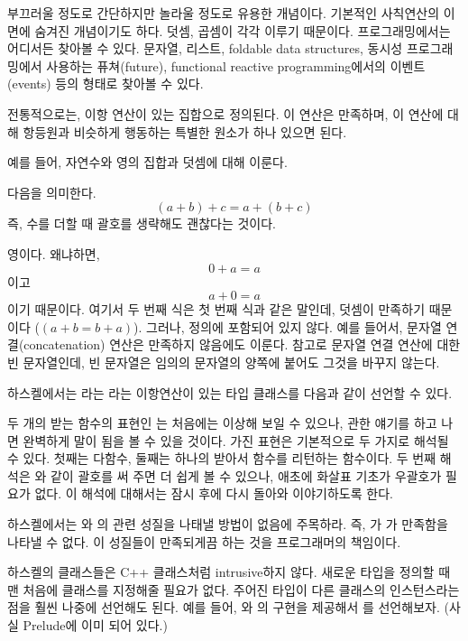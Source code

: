  부끄러울 정도로 간단하지만 놀라울 정도로 유용한 개념이다.
기본적인 사칙연산의 이면에 숨겨진 개념이기도 하다. 덧셈, 곱셈이 각각  이루기 때문이다.
 프로그래밍에서는 어디서든 찾아볼 수 있다.
문자열, 리스트, foldable data structures, 동시성 프로그래밍에서 사용하는 퓨쳐(future), functional reactive programming에서의 이벤트(events)
등의 형태로  찾아볼 수 있다.

전통적으로는,  이항 연산이 있는 집합으로 정의된다. 이 연산은  만족하며, 
이 연산에 대해 항등원과 비슷하게 행동하는 특별한 원소가 하나 있으면 된다.

예를 들어, 자연수와 영의 집합과 덧셈에 대해  이룬다.

 다음을 의미한다.
\[(a + b) + c = a + (b + c)\]
즉, 수를 더할 때 괄호를 생략해도 괜찮다는 것이다.

 영이다. 왜냐하면,
\[0 + a = a\]
이고
\[a + 0 = a\]
이기 때문이다. 여기서 두 번째 식은 첫 번째 식과 같은 말인데, 덧셈이  만족하기 때문이다 ($(a + b
= b + a)$).
그러나,   정의에 포함되어 있지 않다.
예를 들어서, 문자열 연결(concatenation) 연산은  만족하지 않음에도  이룬다.
참고로 문자열 연결 연산에 대한  빈 문자열인데, 빈 문자열은 임의의 문자열의 양쪽에 붙어도 그것을 바꾸지 않는다.

하스켈에서는 라는  라는 이항연산이 있는 \trMonoid 타입 클래스를 다음과 같이 선언할 수 있다. 

두 개의  받는 함수의 표현인
는 처음에는 이상해 보일 수 있으나,
 관한 얘기를 하고 나면 완벽하게 말이 됨을 볼 수 있을 것이다. 
 가진 표현은 기본적으로 두 가지로 해석될 수 있다. 첫째는 다\trArgument 함수, 
둘째는 하나의  받아서 함수를 리턴하는 함수이다. 
두 번째 해석은 와 같이 괄호를 써 주면 더 쉽게 볼 수 있으나, 
애초에 화살표 기초가 우 괄호가 필요가 없다.
이 해석에 대해서는 잠시 후에 다시 돌아와 이야기하도록 한다.

하스켈에서는 와 의 \trMonoid 관련 성질을 나태낼 방법이 없음에 주목하라.
즉, 가  가  만족함을 나타낼 수 없다.
이 성질들이 만족되게끔 하는 것을 프로그래머의 책임이다.

하스켈의 클래스들은 C++ 클래스처럼 intrusive하지 않다.
새로운 타입을 정의할 때 맨 처음에 클래스를 지정해줄 필요가 없다. 
주어진 타입이 다른 클래스의 인스턴스라는 점을 훨씬 나중에 선언해도 된다.
예를 들어, 와 의 구현을 제공해서 를  선언해보자.
(사실 Prelude에 이미 되어 있다.)


